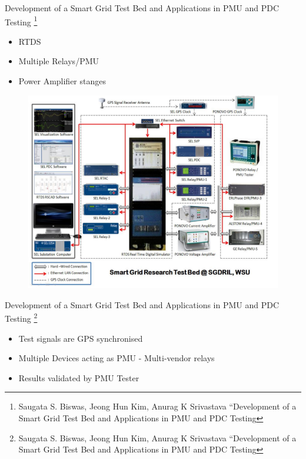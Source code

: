 \documentclass{beamer}
\begin{document}
\begin{frame}{\tiny{Development of a Smart Grid Test Bed and Applications in PMU and PDC Testing} \footnote{\tiny Saugata S. Biswas, Jeong Hun Kim, Anurag K Srivastava “Development of a Smart Grid Test Bed and Applications in PMU and PDC Testing} }
\begin{itemize}
\tiny
\item RTDS
\item Multiple Relays/PMU
\item Power Amplifier stanges 
\end{itemize}
\begin{figure}
\includegraphics[scale=0.27]{wsu_pmu_setup.png}
\end{figure}
\end{frame}


\begin{frame}{\tiny{Development of a Smart Grid Test Bed and Applications in PMU and PDC Testing} \footnote{\tiny Saugata S. Biswas, Jeong Hun Kim, Anurag K Srivastava “Development of a Smart Grid Test Bed and Applications in PMU and PDC Testing} }
\begin{itemize}
\item Test signals are GPS synchronised
\item Multiple Devices acting as PMU - Multi-vendor relays
\item Results validated by PMU Tester
\end{itemize}
\end{frame}   
\end{document}
